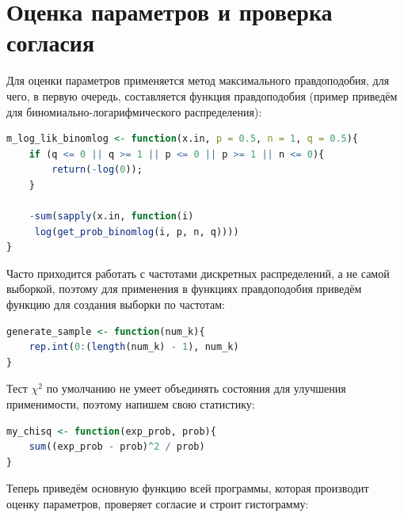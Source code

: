 \documentclass[12pt, specialist, subf, substylefile = spbu_report.rtx]{disser}
\begin{document}
	\section{Оценка параметров и проверка согласия}
	
	Для оценки параметров применяется метод максимального правдоподобия, для чего, в первую очередь, составляется функция правдоподобия (пример приведём для биномиально-логарифмического распределения):
	
	\begin{lstlisting}[language=R]
m_log_lik_binomlog <- function(x.in, p = 0.5, n = 1, q = 0.5){
	if (q <= 0 || q >= 1 || p <= 0 || p >= 1 || n <= 0){
		return(-log(0));
	}
	
	-sum(sapply(x.in, function(i)
	 log(get_prob_binomlog(i, p, n, q))))
}
	\end{lstlisting}

	Часто приходится работать с частотами дискретных распределений, а не самой выборкой, поэтому для применения в функциях правдоподобия приведём функцию для создания выборки по частотам:
	
\begin{lstlisting}[language=R]
generate_sample <- function(num_k){
	rep.int(0:(length(num_k) - 1), num_k)
}
\end{lstlisting}	

	Тест $\chi ^2$ по умолчанию не умеет объединять состояния для улучшения применимости, поэтому напишем свою статистику:
	
\begin{lstlisting}[language=R]
my_chisq <- function(exp_prob, prob){
	sum((exp_prob - prob)^2 / prob)
}
\end{lstlisting}

	Теперь приведём основную функцию всей программы, которая производит оценку параметров, проверяет согласие и строит гистограмму:
\end{document}
